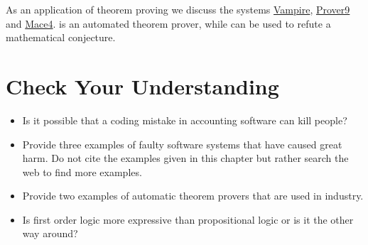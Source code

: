 \begin{enumerate}[(a)]
      As an application of theorem proving we discuss the systems \href{https://vprover.github.io/}{Vampire},
      \href{https://www.cs.unm.edu/~mccune/mace4/}{Prover9} and
      \href{https://www.cs.unm.edu/~mccune/mace4/}{Mace4}.  is an automated theorem prover, while
       can be used to refute a mathematical conjecture.
\end{enumerate}

\section{Check Your Understanding}
\begin{itemize}
\item Is it possible that a coding mistake in accounting software can kill people?
\item Provide three examples of faulty software systems that have caused great harm.
      Do not cite the examples given in this chapter but rather search the web to find more examples.
  
\item Provide two examples of automatic theorem provers that are used in industry.
\item Is first order logic more expressive than propositional logic or is it the other way around?
\end{itemize}


